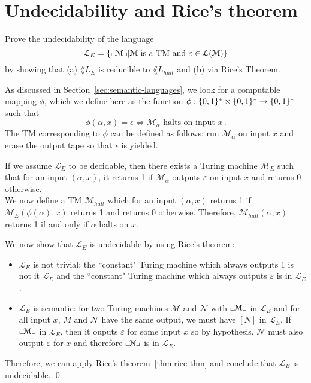 \section{Undecidability and Rice's theorem}

\begin{ex}
	Prove the undecidability of the language
	\[
		\mathcal{L}_E =
		\{ \llcorner \mathcal{M} \lrcorner | \mathcal{M} \text{ is a TM and } \varepsilon \in \mathcal{L}(\mathcal{M})\}
	\]
	by showing that (a) $\lang{L}_E$ is reducible to $\lang{L}_{halt}$ and (b) via Rice's Theorem.
\end{ex}
\begin{solution}
	As discussed in Section~\ref{sec:semantic-languages}, we look for a computable mapping $\phi$, which we define here as the function $\phi : \{ 0,1 \}^*  \times \{ 0,1 \}^*  \to \{ 0,1 \}^* $ such that
	\[
		\phi (\alpha, x) = \epsilon \iff \mathcal{M}_{\alpha} \text{ halts on input } x \, .
	\]
	The TM corresponding to $\phi$ can be defined as follows: run $\mathcal{M}_{\alpha}$ on input $x$ and erase the output tape so that $\epsilon$ is yielded.

	If we assume $\mathcal{L}_E$ to be decidable, then there exists a Turing machine $\mathcal{M}_E$ such that for an input $(\alpha, x)$, it returns 1 if $\mathcal{M}_\alpha$ outputs $\varepsilon$ on input $x$ and returns 0 otherwise. \\
	We now define a TM $\mathcal{M}_{halt}$ which for an input $(\alpha,x)$ returns 1 if $\mathcal{M}_E(\phi(\alpha),x)$ returns 1 and returns 0 otherwise. Therefore, $\mathcal{M}_{halt}(\alpha,x)$ returns 1 if and only if $\alpha$ halts on $x$.

	We now show that $\mathcal{L}_E$ is undecidable by using Rice's theorem:
	\begin{itemize}
		\item $\mathcal{L}_E$ is not trivial: the ``constant" Turing machine which always outputs 1 is not it $\mathcal{L}_E$ and the ``constant" Turing machine which always outputs $\varepsilon$ is in $\mathcal{L}_E$.

		\item $\mathcal{L}_E$ is semantic: for two Turing machines $\mathcal{M}$ and $\mathcal{N}$ with $\llcorner \mathcal{M} \lrcorner$ in $\mathcal{L}_E$ and for all input $x$, $M$ and $\mathcal{N}$ have the same output, we must have $[N]$ in $\mathcal{L}_E$. If $\llcorner \mathcal{M} \lrcorner$ in $\mathcal{L}_E$, then it ouputs $\varepsilon$ for some input $x$ so by hypothesis, $\mathcal{N}$ must also output $\varepsilon$ for $x$ and therefore $\llcorner \mathcal{N} \lrcorner$ is in $\mathcal{L}_E$.
	\end{itemize}

	Therefore, we can apply Rice's theorem~\ref{thm:rice-thm} and conclude that $\mathcal{L}_E$ is undecidable. \qed


\end{solution}

